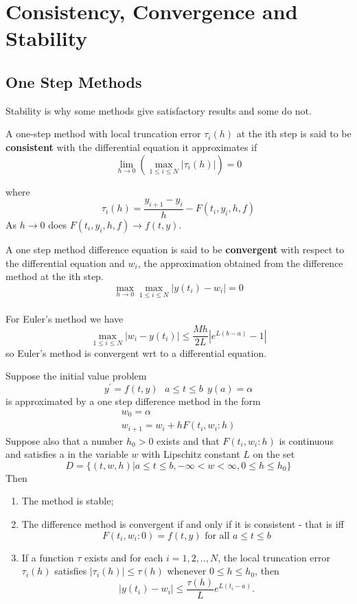 \chapter{Consistency, Convergence and Stability}
\section{One Step Methods}
Stability is why some methods give satisfactory results and some do not.
\begin{definition}
A one-step method with local truncation error $\tau_{i}(h)$ at the ith step is said
to be \textbf{consistent} with the differential equation it approximates if 
\[\lim_{h \rightarrow 0} (\max_{1 \leq i \leq N}|\tau_{i}(h)|)=0 \]
\end{definition}
where
\[\tau_{i}(h)=\frac{y_{i+1}-y_{i}}{h}-F(t_i,y_i,h,f) \]
As $h \rightarrow 0$ does $F(t_i,y_i,h,f) \rightarrow f(t,y)$. 
\\
\begin{definition}
A one step method difference equation is said to be \textbf{convergent} with respect to
the differential equation and $w_i$, the approximation obtained from the difference
method at the ith step.
\[ \max_{h \rightarrow 0}\max_{1 \leq i \leq N}|y(t_i)-w_i|=0\]
\\
For Euler's method we have
\[\max_{1 \leq i \leq N}|w_i-y(t_i)| \leq \frac{Mh}{2L}|e^{L(b-a)}-1|\]
so Euler's method is convergent wrt to a differential equation.
\end{definition}
\begin{theorem}
Suppose the initial value problem
\[y^{'}=f(t,y) \ \ \ a \leq t \leq b \ \ y(a)=\alpha \]
is approximated by a one step difference method in the form
\[
\begin{array}{l}
w_0=\alpha\\
w_{i+1}=w_i+hF(t_i,w_i:h)
\end{array}
\]
Suppose also that  a number $h_0>0$ exists and that $F(t_i,w_i:h)$ is continuous and satisfies a  in the variable $w$ with Lipschitz constant $L$ on the set
\[
D=\{(t,w,h)|a\leq t \leq b, -\infty < w < \infty, 0\leq h \leq h_0\}
\]
Then
\begin{enumerate}
\item 
The method is stable;
\item
The difference method is convergent if and only if it is consistent - that is iff
\[F(t_i,w_i:0)=f(t,y) \mbox{ for all } a \leq t \leq b \]
\item
If a function $\tau$ exists and for each $i=1,2,..,N$, the local truncation error
$\tau_{i}(h)$ satisfies $|\tau_i(h)|\leq \tau(h)$ whenever $0\leq h \leq h_0$, then
\[|y(t_i)-w_i| \leq \frac{\tau(h)}{L}e^{L(t_i-a)}.\]
\end{enumerate}
\end{theorem}
